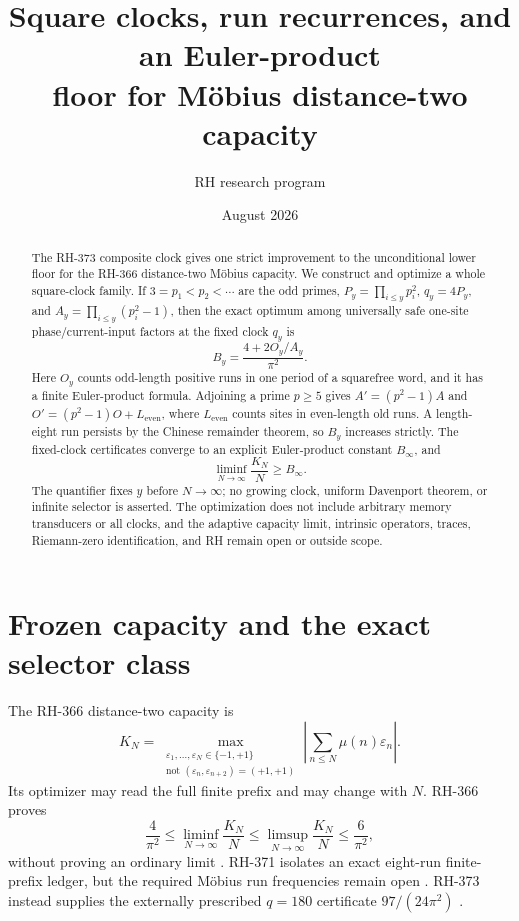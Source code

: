 \documentclass[11pt]{article}
\title{Square clocks, run recurrences, and an Euler-product\\
floor for M\"obius distance-two capacity}
\author{RH research program}
\date{August 2026}
\theoremstyle{definition}
\theoremstyle{remark}
\newcommand{\Mob}{\mu}
\newcommand{\eps}{\varepsilon}
\begin{document}
\maketitle

\begin{abstract}
The RH-373 composite clock gives one strict improvement to the unconditional
lower floor for the RH-366 distance-two M\"obius capacity.  We construct and
optimize a whole square-clock family.  If $3=p_1<p_2<\cdots$ are the odd
primes, $P_y=\prod_{i\le y}p_i^2$, $q_y=4P_y$, and
$A_y=\prod_{i\le y}(p_i^2-1)$, then the exact optimum among universally safe
one-site phase/current-input factors at the fixed clock $q_y$ is
\[
 B_y=\frac{4+2O_y/A_y}{\pi^2}.
\]
Here $O_y$ counts odd-length positive runs in one period of a squarefree
word, and it has a finite Euler-product formula.  Adjoining a prime $p\ge5$
gives $A'=(p^2-1)A$ and
$O'=(p^2-1)O+L_{\mathrm{even}}$, where $L_{\mathrm{even}}$ counts sites in even-length
old runs.  A length-eight run persists by the Chinese remainder theorem, so
$B_y$ increases strictly.  The fixed-clock certificates converge to an
explicit Euler-product constant $B_\infty$, and
\[
        \liminf_{N\to\infty}\frac{K_N}{N}\ge B_\infty.
\]
The quantifier fixes $y$ before $N\to\infty$; no growing clock, uniform
Davenport theorem, or infinite selector is asserted.  The optimization does
not include arbitrary memory transducers or all clocks, and the adaptive
capacity limit, intrinsic operators, traces, Riemann-zero identification,
and RH remain open or outside scope.
\end{abstract}

\section{Frozen capacity and the exact selector class}

The RH-366 distance-two capacity is
\begin{equation}
 K_N=\max_{\substack{\eps_1,\ldots,\eps_N\in\{-1,+1\}\\
 \text{not }(\eps_n,\eps_{n+2})=(+1,+1)}}
 \left|\sum_{n\le N}\Mob(n)\eps_n\right|.
 \label{eq:capacity}
\end{equation}
Its optimizer may read the full finite prefix and may change with $N$.
RH-366 proves
\begin{equation}
 \frac4{\pi^2}\le\liminf_{N\to\infty}\frac{K_N}{N}
 \le\limsup_{N\to\infty}\frac{K_N}{N}\le\frac6{\pi^2},
 \label{eq:old-bracket}
\end{equation}
without proving an ordinary limit \cite{RH366}.  RH-371 isolates an exact
eight-run finite-prefix ledger, but the required M\"obius run frequencies
remain open \cite{RH371}.  RH-373 instead supplies the externally prescribed
$q=180$ certificate $97/(24\pi^2)$ \cite{RH373}.
\end{document}
